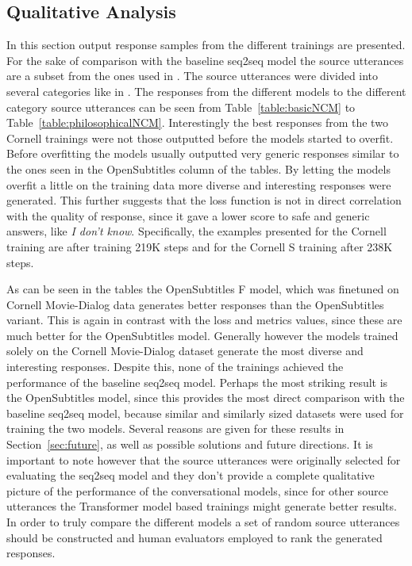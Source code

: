 \documentclass[12pt]{article}
\begin{document}
\subsection{Qualitative Analysis} \label{ssec:52}
In this section output response samples from the different trainings are presented. For the sake of comparison with the baseline seq2seq model the source utterances are a subset from the ones used in \cite{Vinyals:2015}. The source utterances were divided into several categories like in \cite{Vinyals:2015}. The responses from the different models to the different category source utterances can be seen from Table~\ref{table:basicNCM} to Table~\ref{table:philosophicalNCM}. Interestingly the best responses from the two Cornell trainings were not those outputted before the models started to overfit. Before overfitting the models usually outputted very generic responses similar to the ones seen in the OpenSubtitles column of the tables. By letting the models overfit a little on the training data more diverse and interesting responses were generated. This further suggests that the loss function is not in direct correlation with the quality of response, since it gave a lower score to safe and generic answers, like \textit{I don't know}. Specifically, the examples presented for the Cornell training are after training 219K steps and for the Cornell S training after 238K steps. 

As can be seen in the tables the OpenSubtitles F model, which was finetuned on Cornell Movie-Dialog data generates better responses than the OpenSubtitles variant. This is again in contrast with the loss and metrics values, since these are much better for the OpenSubtitles model. Generally however the models trained solely on the Cornell Movie-Dialog dataset generate the most diverse and interesting responses. Despite this, none of the trainings achieved the performance of the baseline seq2seq model. Perhaps the most striking result is the OpenSubtitles model, since this provides the most direct comparison with the baseline seq2seq model, because similar and similarly sized datasets were used for training the two models. Several reasons are given for these results in Section~\ref{sec:future}, as well as possible solutions and future directions. It is important to note however that the source utterances were originally selected for evaluating the seq2seq model and they don't provide a complete qualitative picture of the performance of the conversational models, since for other source utterances the Transformer model based trainings might generate better results. In order to truly compare the different models a set of random source utterances should be constructed and human evaluators employed to rank the generated responses.
\end{document}
